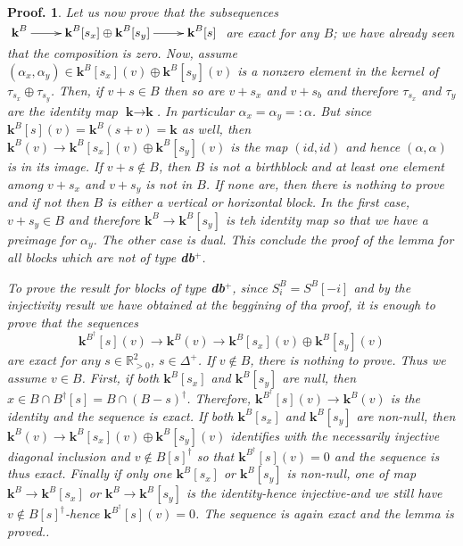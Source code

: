 \documentclass[a4paper, english, 11pt]{article}
\newcommand{\kk}[0]{\textbf{k}}
\newcommand{\0}{\vec{0}}
\newcommand{\R}[0]{\mathbb{R}}
\newtheorem*{pf}{Proof.} }
\begin{document}
\begin{pf}
 Let us now prove that the subsequences $ \xymatrix{\kk^B \ar[r] & \kk^B[s_x] \oplus \kk^B[s_y] \ar[r] & \kk^B[s]}$ are exact for any $B$; we have already seen that the composition is zero. Now, assume $(\alpha_x, \alpha_y) \in  \kk^B[s_x](v) \oplus \kk^B[s_y](v)$ is a \emph{nonzero} element in the kernel of $\tau_{s_x} \oplus \tau_{s_y}$. Then, if $v+s \in B$ then so are $v+s_x$ and $v+s_b$ and therefore $\tau_{s_x}$ and $\tau_{y}$ are the identity map $\kk \to \kk$. In particular $\alpha_x=\alpha_y=:\alpha$. But since $\kk^{B}[s](v)= \kk^{B}(s+v)=\kk$ as well, then $\kk^B(v)\to  
  \kk^B[s_x](v) \oplus \kk^B[s_y](v)$ is the map $(id, id)$ and hence $(\alpha, \alpha)$ is in its image. If $v+s\notin B$, then $B$ is not a birthblock and at least one element among $v+s_x$ and $v+s_y$ is not in $B$. If none are, then there is nothing to prove and if not then $B$ is either a vertical or horizontal block. In the first case, $v+s_y \in B$ and therefore $\kk^B \to \kk^B[s_y]$ is teh identity map so that we have a preimage for $\alpha_y$. The other case is dual. This conclude the proof of the lemma for all blocks which are not of type \textbf{db}$^+$. 
 
 \smallskip 
 
 To prove the result for blocks of type \textbf{db}$^+$, since $S_i^B = S^B [-i]$ and by the injectivity result we have obtained at the beggining of tha proof, it is enough to prove that the sequences 
 $$ \kk^{B^\dagger}[s](v) \to \kk^B(v) \to \kk^B[s_x](v)\oplus \kk^B[s_y](v)  $$
 are exact for any $s\in \R^2_{>0}$, $s\in \Delta^+$. If $v\notin B$, there is nothing to prove. Thus we assume $v\in B$.
 First, if both $\kk^B[s_x]$ and $\kk^B[s_y]$ are null, then  $x\in B\cap B^\dagger[s]= B\cap (B-s)^{\dagger}$. 
 Therefore, $\kk^{B^\dagger}[s](v) \to \kk^B(v)$ is the identity and the sequence is exact. 
 If both $\kk^B[s_x]$ and $\kk^B[s_y]$ are non-null, then $\kk^B(v) \to \kk^B[s_x](v)\oplus \kk^B[s_y](v) $ identifies with the necessarily injective diagonal inclusion and $v\notin B[s]^\dagger$ so that $\kk^{B^\dagger}[s](v)=0$ and the sequence is thus exact. 
 Finally if only one $\kk^B[s_x]$ or $\kk^B[s_y]$ is non-null, one of map $\kk^B\to \kk^B[s_x]$ or $\kk^B\to \kk^B[s_y]$  is the identity-hence injective-and  we still have $v\notin B[s]^\dagger$-hence  $\kk^{B^\dagger}[s](v)=0$. The sequence is again exact and the lemma is proved..
 \end{pf}
\end{document}
